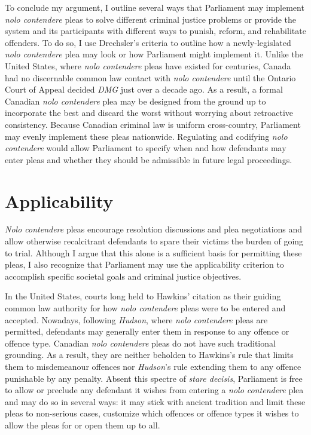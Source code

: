 To conclude my argument, I outline several ways that Parliament may implement \textit{nolo contendere} pleas to solve different criminal justice problems or provide the system and its participants with different ways to punish, reform, and rehabilitate offenders. To do so, I use Drechsler's criteria to outline how a newly-legislated \textit{nolo contendere} plea may look or how Parliament might implement it. Unlike the United States, where \textit{nolo contendere} pleas have existed for centuries, Canada had no discernable common law contact with \textit{nolo contendere} until the Ontario Court of Appeal decided \textit{DMG} just over a decade ago. As a result, a formal Canadian \textit{nolo contendere} plea may be designed from the ground up to incorporate the best and discard the worst without worrying about retroactive consistency. Because Canadian criminal law is uniform cross-country, Parliament may evenly implement these pleas nationwide. Regulating and codifying \textit{nolo contendere} would allow Parliament to specify when and how defendants may enter pleas and whether they should be admissible in future legal proceedings.

\section{Applicability}

\textit{Nolo contendere} pleas encourage resolution discussions and plea negotiations and allow otherwise recalcitrant defendants to spare their victims the burden of going to trial. Although I argue that this alone is a sufficient basis for permitting these pleas, I also recognize that Parliament may use the applicability criterion to accomplish specific societal goals and criminal justice objectives.

In the United States, courts long held to Hawkins' citation as their guiding common law authority for how \textit{nolo contendere} pleas were to be entered and accepted. Nowadays, following \textit{Hudson}, where \textit{nolo contendere} pleas are permitted, defendants may generally enter them in response to any offence or offence type. Canadian \textit{nolo contendere} pleas do not have such traditional grounding. As a result, they are neither beholden to Hawkins's rule that limits them to misdemeanour offences nor \textit{Hudson}'s rule extending them to any offence punishable by any penalty. Absent this spectre of \textit{stare decisis}, Parliament is free to allow or preclude any defendant it wishes from entering a \textit{nolo contendere} plea and may do so in several ways: it may stick with ancient tradition and limit these pleas to non-serious cases, customize which offences or offence types it wishes to allow the pleas for or open them up to all.

